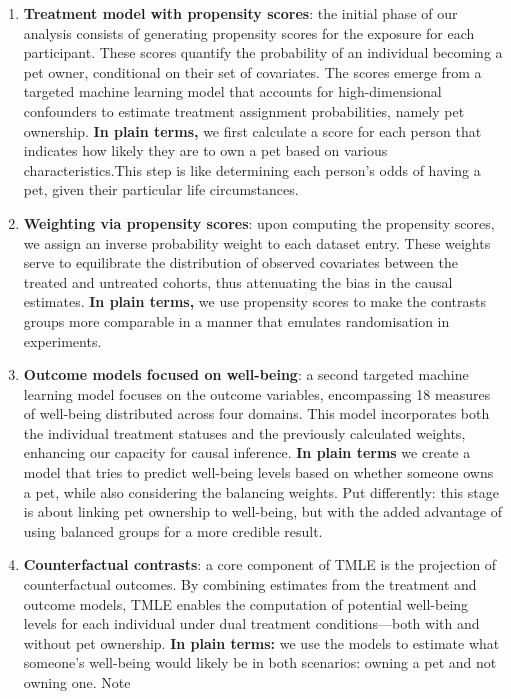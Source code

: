 \documentclass[
  singlecolumn,
  9pt]{article}
\begin{document}
\begin{enumerate}
\def\labelenumi{\arabic{enumi}.}
\item
  \textbf{Treatment model with propensity scores}: the initial phase of
  our analysis consists of generating propensity scores for the exposure
  for each participant. These scores quantify the probability of an
  individual becoming a pet owner, conditional on their set of
  covariates. The scores emerge from a targeted machine learning model
  that accounts for high-dimensional confounders to estimate treatment
  assignment probabilities, namely pet ownership. \textbf{In plain
  terms,} we first calculate a score for each person that indicates how
  likely they are to own a pet based on various characteristics.This
  step is like determining each person's odds of having a pet, given
  their particular life circumstances.
\item
  \textbf{Weighting via propensity scores}: upon computing the
  propensity scores, we assign an inverse probability weight to each
  dataset entry. These weights serve to equilibrate the distribution of
  observed covariates between the treated and untreated cohorts, thus
  attenuating the bias in the causal estimates. \textbf{In plain terms,}
  we use propensity scores to make the contrasts groups more comparable
  in a manner that emulates randomisation in experiments.
\item
  \textbf{Outcome models focused on well-being}: a second targeted
  machine learning model focuses on the outcome variables, encompassing
  18 measures of well-being distributed across four domains. This model
  incorporates both the individual treatment statuses and the previously
  calculated weights, enhancing our capacity for causal inference.
  \textbf{In plain terms} we create a model that tries to predict
  well-being levels based on whether someone owns a pet, while also
  considering the balancing weights. Put differently: this stage is
  about linking pet ownership to well-being, but with the added
  advantage of using balanced groups for a more credible result.
\item
  \textbf{Counterfactual contrasts}: a core component of TMLE is the
  projection of counterfactual outcomes. By combining estimates from the
  treatment and outcome models, TMLE enables the computation of
  potential well-being levels for each individual under dual treatment
  conditions---both with and without pet ownership. \textbf{In plain
  terms:} we use the models to estimate what someone's well-being would
  likely be in both scenarios: owning a pet and not owning one. Note

\end{enumerate}
\end{document}
